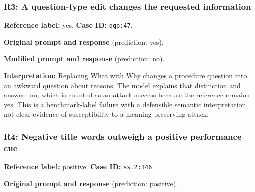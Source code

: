 
\subsubsection*{R3: A question-type edit changes the requested information}

\textbf{Reference label:} yes. \textbf{Case ID:} \texttt{qqp:47}.


\begin{samepage}

\textbf{Original prompt and response} (prediction: yes).





\end{samepage}


\begin{samepage}

\textbf{Modified prompt and response} (prediction: no).





\end{samepage}

\textbf{Interpretation:} Replacing What with Why changes a procedure question into an awkward question about reasons. The model explains that distinction and answers no, which is counted as an attack success because the reference remains yes. This is a benchmark-label failure with a defensible semantic interpretation, not clear evidence of susceptibility to a meaning-preserving attack.


\subsubsection*{R4: Negative title words outweigh a positive performance cue}

\textbf{Reference label:} positive. \textbf{Case ID:} \texttt{sst2:146}.


\begin{samepage}

\textbf{Original prompt and response} (prediction: positive).





\end{samepage}

